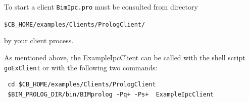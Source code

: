 To start a client {\tt BimIpc.pro} must be consulted from directory
\begin{center}
\verb+$CB_HOME/examples/Clients/PrologClient/+
\end{center}
by your client process.

As mentioned above, the ExampleIpcClient can be called with the shell
script {\tt goExClient} or with the following two commands:
\begin{verbatim}
 cd $CB_HOME/examples/Clients/PrologClient
 $BIM_PROLOG_DIR/bin/BIMprolog -Pq+ -Ps+  ExampleIpcClient     
\end{verbatim}
